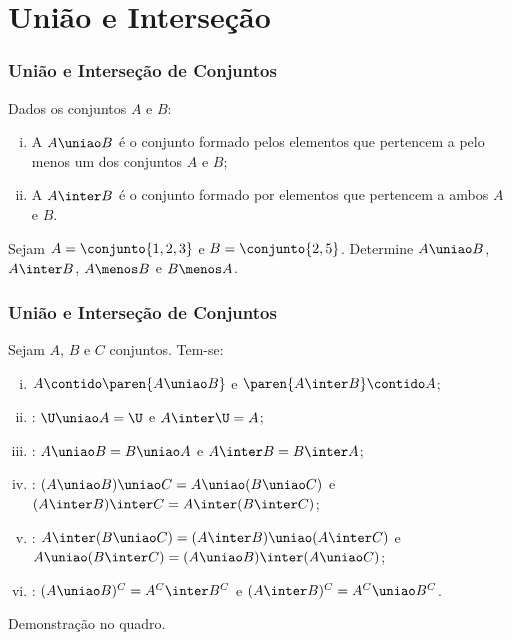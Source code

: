 \section{União e Interseção}


\begin{frame}
	\frametitle{União e Interseção de Conjuntos} 

	\begin{definicao}
	Dados os conjuntos $A$ e $B$:
	\begin{enumerate}[i.]
		\item A  $A \uniao B$ é o conjunto formado pelos
		elementos que pertencem a pelo menos um dos conjuntos $A$ e $B$;
		\item A  $A \inter B$ é o conjunto formado por elementos que pertencem a ambos $A$ e
		$B$.
	\end{enumerate}
	\end{definicao}

	\begin{exemplo}
	Sejam $A = \conjunto{1, 2, 3}$ e $ B = \conjunto{2,5}$. Determine $A \uniao B$,
	$A \inter B$, $A \menos B$ e $B \menos A$.
\end{exemplo}

\end{frame}


\begin{frame}
	\frametitle{União e Interseção de Conjuntos} 
	
	\begin{proposicao}
		\label{propuniaoint}
		Sejam $A$, $B$ e $C$ conjuntos. Tem-se:
		\begin{enumerate}[i.]
			\item $A \contido \paren{A \uniao B}$ e $\paren{A \inter B} \contido A$;
			\item {}: $\U \uniao A = \U$ e $A \inter \U = A$;
			\item {}: $A \uniao B = B \uniao A$ e $A \inter B = B \inter A$;
			\item {}: $(A \uniao B) \uniao C = A \uniao (B \uniao C)$ e $(A \inter B) \inter C = A \inter (B \inter C)$;
			\item {}: $A \inter
			(B \uniao C) = (A \inter B) \uniao (A \inter C)$ e $A \uniao (B \inter C) = (A \uniao B) \inter (A \uniao C)$;
			\item {}: $(A \uniao B)^C = A^C \inter B^C$ e $(A \inter B)^C = A^C \uniao B^C$.
		\end{enumerate}
	\end{proposicao}

	Demonstração no quadro.
\end{frame}